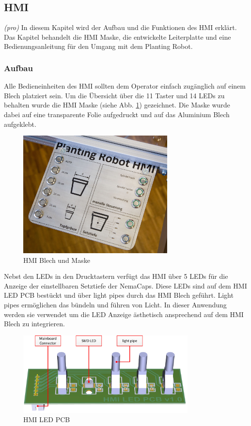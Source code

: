 \subsection{HMI} \label{sec:HMI}
\textit{(pro)} In diesem Kapitel wird der Aufbau und die Funktionen des HMI erklärt. Das Kapitel behandelt die HMI Maske, die entwickelte Leiterplatte und eine Bedienungsanleitung für den Umgang mit dem Planting Robot.

\subsubsection{Aufbau}
Alle Bedieneinheiten des HMI sollten dem Operator einfach zugänglich auf einem Blech platziert sein. Um die Übersicht über die 11 Taster und 14 LEDs zu behalten wurde die HMI Maske (siehe Abb. \ref{fig:HMI_Maske}) gezeichnet. Die Maske wurde dabei auf eine transparente Folie aufgedruckt und auf das Aluminium Blech aufgeklebt.

\begin{figure}[H]
	\includegraphics[width=0.7\textwidth]{Illustrationen/6-Umsetzung/HMI_Foto.jpg}
	\caption{HMI Blech und Maske}
	\label{fig:HMI_Maske}
\end{figure}

Nebst den LEDs in den Drucktastern verfügt das HMI über 5 LEDs für die Anzeige der einstellbaren Setztiefe der NemaCaps. Diese LEDs sind auf dem HMI LED PCB bestückt und über light pipes durch das HMI Blech geführt. Light pipes ermöglichen das bündeln und führen von Licht. In dieser Anwendung werden sie verwendet um die LED Anzeige ästhetisch ansprechend auf dem HMI Blech zu integrieren.

\begin{figure}[H]
	\includegraphics[width=0.8\textwidth]{Illustrationen/6-Umsetzung/LED_PCB_3D.jpg}
	\caption{HMI LED PCB}
	\label{fig:LED_PCB_1}
\end{figure}

